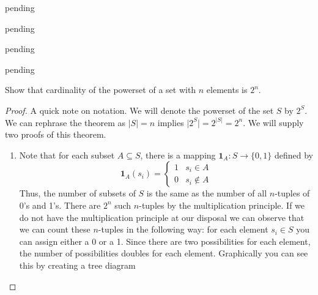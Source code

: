 \begin{exercise} \label{0.97}
	pending
\end{exercise}

\begin{exercise} \label{0.98}
	pending
\end{exercise}

\begin{exercise} \label{0.99}
	pending
\end{exercise}

\begin{exercise} \label{0.100}
	pending
\end{exercise}

\begin{exercise} \label{0.101}
	Show that cardinality of the powerset of a set with \( n \) elements is \( 2^n \).
	
	\begin{proof}
	    A quick note on notation. We will denote the powerset of the set \( S \) by \( 2^S \). We can rephrase the theorem as \( \vert S \vert = n \) implies \( \vert 2^S \vert = 2^{\vert S \vert} = 2^n \). We will supply two proofs of this theorem.
	    
	    \begin{enumerate}
	        \item Note that for each subset \( A \subseteq S \), there is a mapping \( \mathbf{1}_A: S \rightarrow \{ 0,1 \} \) defined by
	        \[ \mathbf{1}_A(s_i) = \begin{cases} 1 & s_i \in A \\ 0 & s_i \not\in A \end{cases} \]
	        Thus, the number of subsets of \( S \) is the same as the number of all \(n\)-tuples of 0's and 1's. There are \( 2^n \) such \(n\)-tuples by the multiplication principle. If we do not have the multiplication principle at our disposal we can observe that we can count these \(n\)-tuples in the following way: for each element \( s_i \in S \) you can assign either a 0 or a 1. Since there are two possibilities for each element, the number of possibilities doubles for each element. Graphically you can see this by creating a tree diagram
	        \begin{center}
\end{center}
\end{enumerate}
\end{proof}
\end{exercise}
